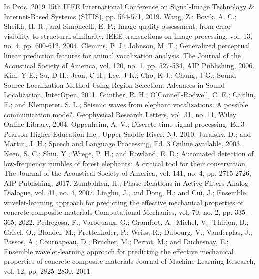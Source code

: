 \documentclass[applsci,article,accept,moreauthors,pdftex]{Definitions/mdpi}
\begin{document}
\begin{thebibliography}{999}
	\newblock In Proc. 2019 15th IEEE International Conference on Signal-Image Technology \& Internet-Based Systems (SITIS), pp. 564-571, 2019.
	Wang, Z.; Bovik, A. C.; Sheikh, H. R.; and Simoncelli, E. P.; \newblock Image quality assessment: from error visibility to structural similarity.
	\newblock IEEE transactions on image processing, vol. 13, no. 4, pp. 600-612, 2004.
	Clemins, P. J.; Johnson, M. T.; \newblock Generalized perceptual linear prediction features for animal vocalization analysis.
	\newblock The Journal of the Acoustical Society of America, vol. 120, no. 1, pp. 527-534, AIP Publishing, 2006.
	Kim, Y-E.; Su, D-H.; Jeon, C-H.; Lee, J-K.; Cho, K-J.; Chung, J-G.; \newblock Sound Source Localization Method Using Region Selection.
	\newblock Advances in Sound Localization, IntecOpen, 2011.
	G{\"u}nther, R. H.; O'Connell-Rodwell, C. E.; Caitlin, E.; and Klemperer. S. L.; \newblock Seismic waves from elephant vocalizations: A possible communication mode?.
	\newblock Geophysical Research Letters, vol. 31, no. 11, Wiley Online Library, 2004.
	Oppenheim, A. V.; \newblock Discrete-time signal processing. Ed.3
	\newblock Pearson Higher Education Inc., Upper Saddle River, NJ, 2010.
	Jurafsky, D.; and Martin, J. H.; \newblock Speech and Language Processing, Ed. 3
	\newblock Online available, 2003.
	Keen, S. C.; Shiu, Y.; Wrege, P. H.; and Rowland, E. D.; \newblock Automated detection of low-frequency rumbles of forest elephants: A critical tool for their conservation
	\newblock The Journal of the Acoustical Society of America, vol. 141, no. 4, pp. 2715-2726, AIP Publishing, 2017.
	Zumbahlen, H.; \newblock Phase Relations in Active Filters
	\newblock Analog Dialogue, vol. 41, no. 4, 2007.
	Linghu, J.; and Dong, H.; and Cui, J.; \newblock Ensemble wavelet-learning approach for predicting the effective mechanical properties of concrete composite materials
	\newblock Computational Mechanics, vol. 70, no. 2, pp. 335--365, 2022.
	Pedregosa, F.; Varoquaux, G.; Gramfort, A.; Michel, V.; Thirion, B.; Grisel, O.; Blondel, M.; Prettenhofer, P.; Weiss, R.; Dubourg, V.; Vanderplas, J.; Passos, A.; Cournapeau, D.; Brucher, M.; Perrot, M.; and Duchesnay, E.; \newblock Ensemble wavelet-learning approach for predicting the effective mechanical properties of concrete composite materials
	\newblock Journal of Machine Learning Research, vol. 12, pp. 2825--2830, 2011.

\end{thebibliography}
\end{document}
